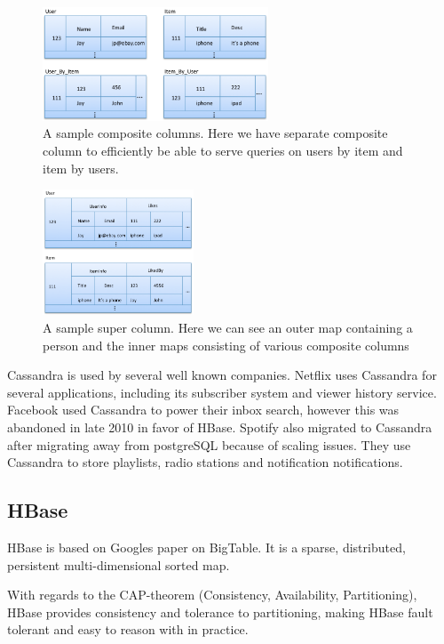 \begin{figure}[h]
    \centering
    \includegraphics[width=0.6\textwidth]{resources/cas_comp_col.png}
    \caption{A sample composite columns. Here we have separate composite column to efficiently be able to serve queries on users by item and item by users.}
    \label{fig:sample_comp_col}
\end{figure}

\begin{figure}[ht]
	\centering
	\includegraphics[width=0.4\textwidth]{resources/cas_super_col.png}
	\caption{A sample super column. Here we can see an outer map containing a person and the inner maps consisting of various composite columns}
	\label{fig:sample_super_col}
\end{figure}

Cassandra is used by several well known companies. Netflix uses Cassandra for several applications, including its subscriber system and viewer history service. Facebook used Cassandra to power their inbox search, however this was abandoned in late 2010 in favor of HBase. Spotify also migrated to Cassandra after migrating away from postgreSQL because of scaling issues. They use Cassandra to store playlists, radio stations and notification notifications.

\subsection{HBase}
HBase is based on Googles paper on BigTable.
It is a sparse, distributed, persistent multi-dimensional sorted map.

With regards to the CAP-theorem (Consistency, Availability, Partitioning), HBase provides consistency and tolerance to partitioning, making HBase fault tolerant and easy to reason with in practice.

